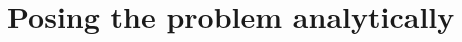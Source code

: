 
 \chapter{Posing the problem analytically}
 \label{chap:Posing}
 
\startappendices



 
 \nocite{*} %
\startbibliography
 \begin{singlespace} %
 \end{singlespace}


